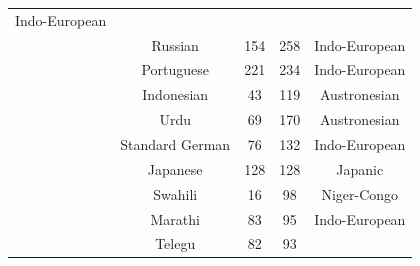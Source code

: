 {\begin{tabular}{|c|c|c|c|c|}
Indo-European \\

	\thetablecount\stepcounter{tablecount} &
Russian &
	

154 &
	

258 &
	

Indo-European \\

	\thetablecount\stepcounter{tablecount} &
Portuguese &
	

221 &
	

234 &
	

Indo-European \\
	\thetablecount\stepcounter{tablecount} &

Indonesian &
	

43 &
	

119 &
	

Austronesian \\

	\thetablecount\stepcounter{tablecount} &
Urdu &
	

69 &
	

170 &
	

Austronesian \\
	\thetablecount\stepcounter{tablecount} &

Standard German &
	

76 &
	

132 &
	

Indo-European \\
	\thetablecount\stepcounter{tablecount} &

Japanese &
	

128 &
	

128 &
	

Japanic \\

	\thetablecount\stepcounter{tablecount} &
Swahili &
	

16 &
	

98 &
	

Niger-Congo \\
	\thetablecount\stepcounter{tablecount} &

Marathi &
	

83 &
	

95 &
	

Indo-European \\

	\thetablecount\stepcounter{tablecount} &
Telegu &
	

82 &
	

93 &
	


\end{tabular}}
